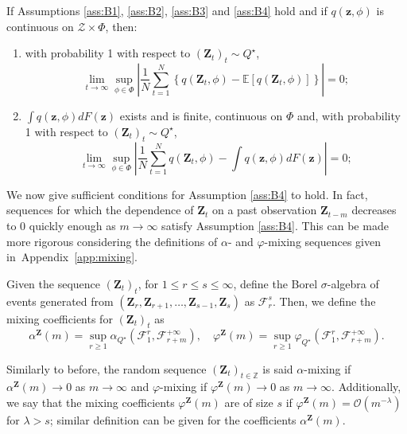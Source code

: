 \documentclass[twoside,11pt]{article}
\newcommand{\E}{\mathbb{E}}
\newcommand{\ddz}{\mathbf{z}}
\newcommand{\Ddz}{\mathbf{Z}}
\begin{document}
	
	
	
	\begin{theorem} \label{Th:ULLN}
		If Assumptions \ref{ass:B1}, \ref{ass:B2}, \ref{ass:B3} and \ref{ass:B4} hold and if $ q(\ddz, \phi) $ is continuous on $ \mathcal{Z}\times \Phi $, then:
		\begin{enumerate}[label=(\roman*)]
			\item with probability 1 with respect to $ (\Ddz_t)_t \sim Q^\star $,
			\begin{equation}\label{}
			\lim_{t\to\infty} \sup_{\phi \in \Phi} \left|\frac{1}{N} \sum_{t=1}^N \left\{ q(\Ddz_t,\phi) - \E\left[ q(\Ddz_t,\phi) \right] \right\} \right| = 0;
			\end{equation}
			\item $ \int q(\ddz,\phi) dF(\ddz) $ exists and is finite, continuous on $ \Phi $ and, with probability 1 with respect to $ (\Ddz_t)_t \sim Q^\star $,
			\begin{equation}\label{}
			\lim_{t\to\infty} \sup_{\phi \in \Phi} \left|\frac{1}{N} \sum_{t=1}^N q(\Ddz_t,\phi) - \int q(\ddz,\phi) dF(\ddz)  \right| = 0;
			\end{equation}
		\end{enumerate}
	\end{theorem}
	
	
	We now give sufficient conditions for Assumption \ref{ass:B4} to hold. In fact, sequences for which the dependence of $ \Ddz_t $ on a past observation $ \Ddz_{t-m} $ decreases to 0 quickly enough as $ m\to\infty $ satisfy Assumption \ref{ass:B4}. This can be made more rigorous considering the definitions of $ \alpha $- and $ \varphi $-mixing sequences given in~Appendix~\ref{app:mixing}. 
	
	Given the sequence $ (\Ddz_t)_t$, for $ 1\le r\le s \le \infty $, define the Borel $ \sigma $-algebra of events generated from $( \Ddz_r, \Ddz_{r+1}, \ldots, \Ddz_{s-1}, \Ddz_s )$ as $ \mathcal{F}_r^s $. Then, we define
	the mixing coefficients for $ (\Ddz_t)_t $ as
	\begin{equation}\label{}
	\alpha^\Ddz(m) = \sup_{r\ge 1} \alpha_{Q^\star}(\mathcal{F}_{1}^r, \mathcal{F}_{r+m}^{+\infty}), \quad\varphi^\Ddz(m) = \sup_{r\ge 1} \varphi_{Q^\star}(\mathcal{F}_{1}^r, \mathcal{F}_{r+m}^{+\infty}).
	\end{equation}
	
	Similarly to before, the random sequence $ (\Ddz_t)_{t\in\mathbb{Z}} $ is said $ \alpha $-mixing if $ \alpha^\Ddz(m )\to 0$ as $ m\to\infty $ and $ \varphi $-mixing if $ \varphi^\Ddz(m )\to 0$ as $ m\to\infty $. Additionally, we say that the mixing coefficients $ \varphi^\Ddz(m) $ are of size $ s $ \citep{domowitz1982} if $ \varphi^\Ddz(m) = \mathcal{O}(m^{-\lambda}) $ for $\lambda>s$; similar definition can be given for the coefficients $ \alpha^\Ddz(m) $.
	
\end{document}
